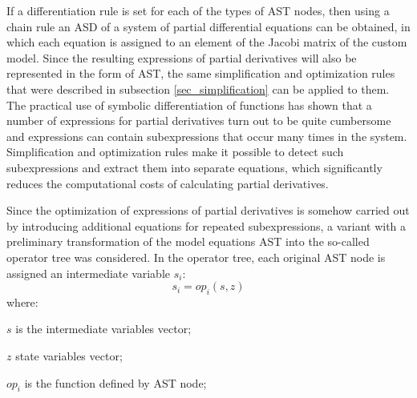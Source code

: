 \documentclass[lettersize,journal]{IEEEtran}
\begin{document}
If a differentiation rule is set for each of the types of AST nodes, then using a chain rule an ASD of a system of partial differential equations can be
obtained, in which each equation is assigned to an element of the Jacobi matrix of the custom model. Since the resulting expressions of partial 
derivatives will also be represented in the form of AST, the same simplification and optimization rules that were described in 
subsection \ref{sec_simplification} can be applied to them. The practical use of symbolic differentiation of functions has shown that a number of
expressions for partial derivatives turn out to be quite cumbersome and expressions can contain subexpressions that occur many times in the system. 
Simplification and optimization rules make it possible to detect such subexpressions and extract them into separate equations, which significantly
reduces the computational costs of calculating partial derivatives.

Since the optimization of expressions of partial derivatives is somehow carried out by introducing additional equations for repeated subexpressions,
a variant with a preliminary transformation of the model equations AST into the so-called operator tree was considered. In the operator tree, 
each original AST node is assigned an intermediate variable \(s_i\):
\begin{equation}
	\label{eqn_opthree}
	s_i=op_i(s,z)
\end{equation}
\noindent where:
\begin{description}
	\item  \(s\) is the intermediate variables vector;
	\item  \(z\) state variables vector;
	\item  \(op_i\) is the function defined by AST node;
\end{description}
\end{document}
